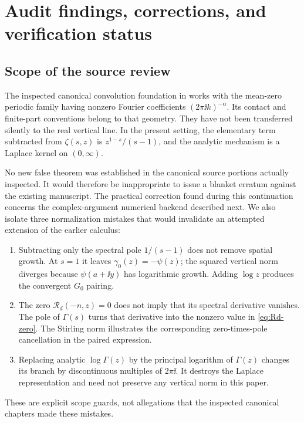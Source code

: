 \section{Audit findings, corrections, and verification status}
\label{sec:audit}

\subsection{Scope of the source review}
The inspected canonical convolution foundation in \cite{repo} works with
the mean-zero periodic family having nonzero Fourier coefficients
$(2\pi\ii k)^{-\alpha}$. Its contact and finite-part conventions belong
to that geometry. They have not been transferred silently to the real
vertical line. In the present setting, the elementary term subtracted from
$\zeta(s,z)$ is $z^{1-s}/(s-1)$, and the analytic mechanism is a Laplace
kernel on $(0,\infty)$.

No new false theorem was established in the canonical source portions
actually inspected. It would therefore be inappropriate to issue a
blanket erratum against the existing manuscript. The practical correction
found during this continuation concerns the complex-argument numerical
backend described next. We also isolate three normalization mistakes
that would invalidate an attempted extension of the earlier calculus:
\begin{enumerate}
\item Subtracting only the spectral pole $1/(s-1)$ does not remove spatial
      growth. At $s=1$ it leaves $\gamma_0(z)=-\psi(z)$; the squared
      vertical norm diverges because $\psi(a+\ii y)$ has logarithmic
      growth. Adding $\log z$ produces the convergent $G_0$ pairing.
\item The zero $\mathcal R_d(-n,z)=0$ does not imply that its spectral
      derivative vanishes. The pole of $\Gamma(s)$ turns that derivative
      into the nonzero value in \eqref{eq:Rd-zero}. The Stirling norm
      illustrates the corresponding zero-times-pole cancellation in
      the paired expression.
\item Replacing analytic $\log\Gamma(z)$ by the principal logarithm of
      $\Gamma(z)$ changes its branch by discontinuous multiples of
      $2\pi\ii$. It destroys the Laplace representation and need not
      preserve any vertical norm in this paper.
\end{enumerate}
These are explicit scope guards, not allegations that the inspected
canonical chapters made these mistakes.

